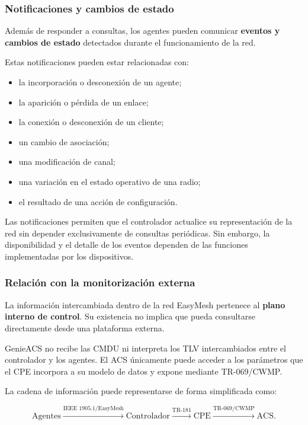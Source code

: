 \subsubsection*{Notificaciones y cambios de estado}

Además de responder a consultas, los agentes pueden comunicar
\textbf{eventos y cambios de estado} detectados durante el funcionamiento
de la red.

Estas notificaciones pueden estar relacionadas con:

\begin{itemize}
    \item la incorporación o desconexión de un agente;
    \item la aparición o pérdida de un enlace;
    \item la conexión o desconexión de un cliente;
    \item un cambio de asociación;
    \item una modificación de canal;
    \item una variación en el estado operativo de una radio;
    \item el resultado de una acción de configuración.
\end{itemize}

Las notificaciones permiten que el controlador actualice su
representación de la red sin depender exclusivamente de consultas
periódicas. Sin embargo, la disponibilidad y el detalle de los eventos
dependen de las funciones implementadas por los dispositivos.


\subsubsection*{Relación con la monitorización externa}

La información intercambiada dentro de la red EasyMesh pertenece al
\textbf{plano interno de control}. Su existencia no implica que pueda
consultarse directamente desde una plataforma externa.

GenieACS no recibe las CMDU ni interpreta los TLV intercambiados entre el
controlador y los agentes. El ACS únicamente puede acceder a los
parámetros que el CPE incorpora a su modelo de datos y expone mediante
TR-069/CWMP.

La cadena de información puede representarse de forma simplificada como:

\[
    \text{Agentes}
    \xrightarrow{\text{IEEE~1905.1/EasyMesh}}
    \text{Controlador}
    \xrightarrow{\text{TR-181}}
    \text{CPE}
    \xrightarrow{\text{TR-069/CWMP}}
    \text{ACS}.
\]


